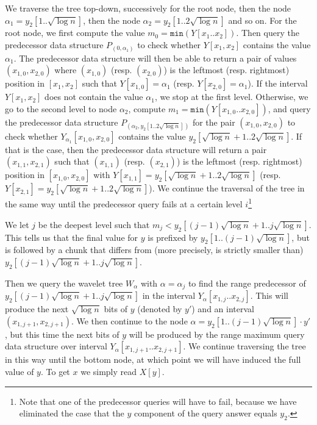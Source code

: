 \documentclass[11pt,runningheads]{llncs}
\begin{document}
We traverse the tree top-down, successively for the root node, 
then the node $\alpha_1=y_2[1..\sqrt{\log n}]$, then the node $\alpha_2=y_2[1..2\sqrt{\log n}]$
and so on. For the root node, we first compute the value $m_0=\mathtt{min}(Y[x_1..x_2])$. 
Then query the predecessor data structure $P_{(0,\alpha_1)}$ to check whether 
$Y[x_1,x_2]$ contains the value $\alpha_1$. The predecessor data structure will then be able to return 
a pair of values $(x_{1,0},x_{2,0})$ where $(x_{1,0})$ (resp. $(x_{2,0})$) 
is the leftmost (resp. rightmost) position in $[x_1,x_2]$ such that $Y[x_{1,0}]=\alpha_1$ 
(resp. $Y[x_{2,0}]=\alpha_1$). If the interval $Y[x_1,x_2]$ does not contain the value $\alpha_1$, 
we stop at the first level. Otherwise, we go to the second level to node $\alpha_2$, compute $m_1=\mathtt{min}(Y[x_{1,0}..x_{2,0}])$, and query the predecessor 
data structure $P_{(\alpha_2,y_2[1..2\sqrt{\log n}])}$ for the pair 
$(x_{1,0},x_{2,0})$ to check whether $Y_{\alpha_1}[x_{1,0},x_{2,0}]$
contains the value $y_2[\sqrt{\log n}+1..2\sqrt{\log n}]$. If that is the case, then
the predecessor data structure will return a pair $(x_{1,1},x_{2,1})$ such 
that $(x_{1,1})$ (resp. $(x_{2,1})$) is the leftmost (resp. rightmost) position 
in $[x_{1,0},x_{2,0}]$ with $Y[x_{1,1}]=y_2[\sqrt{\log n}+1..2\sqrt{\log n}]$ 
(resp. $Y[x_{2,1}]=y_2[\sqrt{\log n}+1..2\sqrt{\log n}]$). 
We continue the traversal of the tree in the same way until the  
predecessor query fails at a certain level $i$\footnote{Note that 
one of the predecessor queries will have to fail, because we have 
eliminated the case that the $y$ component of the query answer 
equals $y_2$.} 

We let $j$ be the deepest level such that $m_j<y_2[(j-1)\sqrt{\log n}+1..j\sqrt{\log n}]$. This tells us 
that the final value for $y$ is prefixed by $y_2[1..(j-1)\sqrt{\log n}]$, 
but is followed by a chunk that differs from  (more precisely, is strictly smaller than) 
$y_2[(j-1)\sqrt{\log n}+1..j\sqrt{\log n}]$. 

Then we query the wavelet tree $W_\alpha$ with
$\alpha=\alpha_j$ to find the range predecessor of $y_2[(j-1)\sqrt{\log n}+1..j\sqrt{\log n}]$
in the interval $Y_\alpha[x_{1,j}..x_{2,j}]$. This will produce the next $\sqrt{\log n}$ bits
of $y$ (denoted by $y'$) and an interval $(x_{1,j+1},x_{2,j+1})$. We then continue to the node 
$\alpha=y_2[1..(j-1)\sqrt{\log n}]\cdot y'$, but this time the next bits of $y$ will be produced 
by the range maximum query data structure over interval $Y_\alpha[x_{1,j+1}..x_{2,j+1}]$. 
We continue traversing the tree in this way until the bottom node,  
at which point we will have induced the full value of $y$. To get $x$ we simply read $X[y]$. 
 
\end{document}
